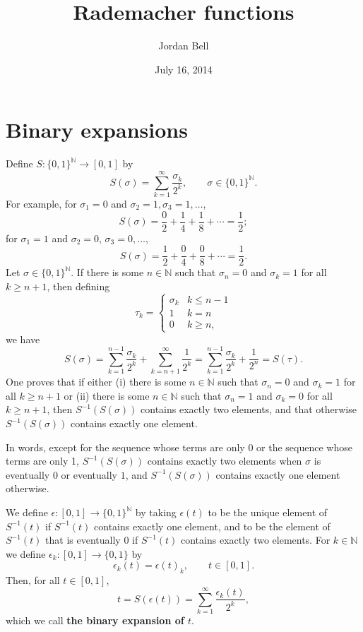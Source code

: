 \documentclass{article}
\theoremstyle{definition}
\begin{document}
\title{Rademacher functions}
\author{Jordan Bell}
\date{July 16, 2014}

\maketitle


\section{Binary expansions}
Define $S:\{0,1\}^\mathbb{N} \to [0,1]$ by
\[
S(\sigma) = \sum_{k=1}^\infty \frac{\sigma_k}{2^k}, \qquad \sigma \in \{0,1\}^\mathbb{N}.
\]
For example, for $\sigma_1=0$ and $\sigma_2=1,\sigma_3=1,\ldots$, 
\[
S(\sigma) = \frac{0}{2}+\frac{1}{4}+\frac{1}{8}+\cdots = \frac{1}{2};
\]
  for $\sigma_1=1$ and $\sigma_2=0$, $\sigma_3=0, \ldots$,
\[
S(\sigma) = \frac{1}{2}+\frac{0}{4}+\frac{0}{8} + \cdots = \frac{1}{2}.
\]
Let $\sigma \in \{0,1\}^\mathbb{N}$. If there is some $n  \in \mathbb{N}$ such that $\sigma_n=0$ and $\sigma_k=1$ for all $k \geq n+1$, then
defining
\[
\tau_k = \begin{cases}
\sigma_k&k \leq n-1\\
1&k=n\\
0&k \geq n,
\end{cases}
\]
we have
\[
S(\sigma) = \sum_{k=1}^{n-1} \frac{\sigma_k}{2^k} + \sum_{k=n+1}^\infty \frac{1}{2^k} = 
 \sum_{k=1}^{n-1} \frac{\sigma_k}{2^k} + \frac{1}{2^n}
 =S(\tau).
\]
One proves that if either (i) there is some $n \in \mathbb{N}$ such that
$\sigma_n=0$ and $\sigma_k=1$ for all $k \geq n+1$ or (ii) there is some $n \in \mathbb{N}$
such that $\sigma_n=1$ and $\sigma_k=0$ for all $k \geq n+1$, then $S^{-1}(S(\sigma))$ contains exactly two elements, and that
otherwise $S^{-1}(S(\sigma))$ contains exactly one element. 

In words, except for the sequence whose terms are only 0 or the sequence whose terms are only 1, $S^{-1}(S(\sigma))$ contains
exactly two elements when $\sigma$ is eventually $0$ or eventually $1$, and $S^{-1}(S(\sigma))$ contains exactly
one element otherwise.

We define $\epsilon:[0,1] \to \{0,1\}^\mathbb{N}$ by taking $\epsilon(t)$
to be  the unique element of $S^{-1}(t)$ if $S^{-1}(t)$ contains exactly one element, and to be the element of $S^{-1}(t)$
that is eventually $0$ if $S^{-1}(t)$ contains exactly two elements.
For $k \in \mathbb{N}$ we define $\epsilon_k:[0,1] \to \{0,1\}$ by
\[
\epsilon_k(t) = \epsilon(t)_k, \qquad t \in [0,1].
\]
Then, for all $t \in [0,1]$,
\begin{equation}
t =S(\epsilon(t))= \sum_{k=1}^\infty \frac{\epsilon_k(t)}{2^k},
\label{binexpansion}
\end{equation}
which we call \textbf{the binary expansion of $t$}.
\end{document}
